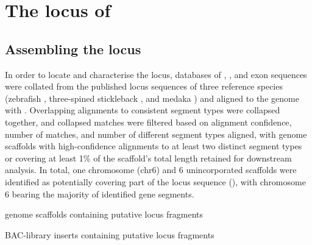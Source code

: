 \section{The \igh{} locus of \nfu}
\label{sec:nfu-locus}

\subsection{Assembling the \Nfu \igh{} locus}
\label{sec:nfu-locus-assembly}

In order to locate and characterise the \nfu \igh{} locus, databases of \vh, \jh, and \ch exon sequences were collated from the published locus sequences of three reference species (zebrafish \parencite{danilova2005zebrafish}, three-spined stickleback \parencite{bao2010stickleback,gambondeza2011stickleback}, and medaka \parencite{magadan2011medaka}) and aligned to the \nfu genome with  \parencite{altschul1990blast,altschul1997blast}. Overlapping alignments to consistent segment types were collapsed together, and collapsed matches were filtered based on alignment confidence, number of matches, and number of different segment types aligned, with genome scaffolds with high-confidence alignments to at least two distinct segment types or covering at least 1\% of the scaffold's total length retained for downstream analysis. In total, one chromosome (chr6) and 6 unincorporated scaffolds were identified as potentially covering part of the locus sequence (), with chromosome 6 bearing the majority of identified gene segments. 

\begin{table}[bh]
\centering
\caption{\Nfu genome scaffolds containing putative \igh{} locus fragments}
\begin{threeparttable}

\end{threeparttable}
\label{tab:nfu-locus-scaffolds}
\end{table}

\begin{table}[bh]
\centering
\caption{\Nfu BAC-library inserts containing putative \igh{} locus fragments}
\begin{threeparttable}

\end{threeparttable}
\label{tab:nfu-locus-bacs}
\end{table}


